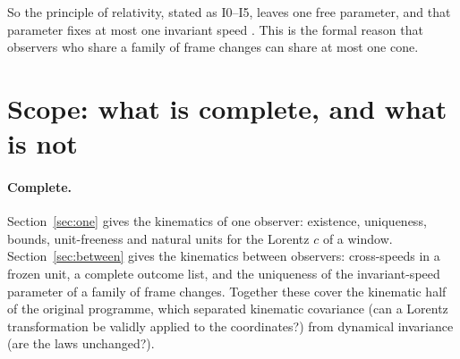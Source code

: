 \documentclass[11pt]{article}
\theoremstyle{definition}
\theoremstyle{plain}
\theoremstyle{remark}
\begin{document}
So the principle of relativity, stated as I0--I5, leaves one free parameter, and that parameter fixes at most one invariant speed \cite{ignatowsky1910,levyleblond1976,mermin1984,pal2003}. This is the formal reason that observers who share a family of frame changes can share at most one cone.

\section{Scope: what is complete, and what is not}\label{sec:scope}

\paragraph{Complete.} Section~\ref{sec:one} gives the kinematics of one observer: existence, uniqueness, bounds, unit-freeness and natural units for the Lorentz $c$ of a window. Section~\ref{sec:between} gives the kinematics between observers: cross-speeds in a frozen unit, a complete outcome list, and the uniqueness of the invariant-speed parameter of a family of frame changes. Together these cover the kinematic half of the original programme, which separated kinematic covariance (can a Lorentz transformation be validly applied to the coordinates?) from dynamical invariance (are the laws unchanged?).
\end{document}
